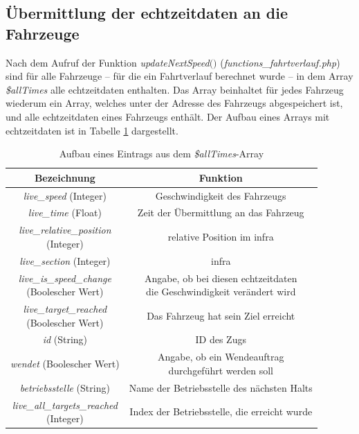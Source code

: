 \subsection{Übermittlung der \Gls{echtzeitdaten} an die Fahrzeuge} \label{main_4}
Nach dem Aufruf der Funktion \textit{updateNextSpeed$($$)$} (\textit{functions\_fahrtverlauf.php}) sind für alle Fahrzeuge -- für die ein Fahrtverlauf berechnet wurde -- in dem Array \textit{\$allTimes} alle \Gls{echtzeitdaten} enthalten. Das Array beinhaltet für jedes Fahrzeug wiederum ein Array, welches unter der Adresse des Fahrzeugs abgespeichert ist, und alle \Gls{echtzeitdaten} eines Fahrzeugs enthält. Der Aufbau eines Arrays mit \Gls{echtzeitdaten} ist in Tabelle \ref{table:aufbauAllTimes} dargestellt.
\begin{table}
\begin{center}
\renewcommand{\arraystretch}{1.4}
\begin{tabular}{c|c}
Bezeichnung & Funktion \\ \hline
\textit{live\_speed} (Integer)                  		&    Geschwindigkeit des Fahrzeugs                \\ \hline
\textit{live\_time} (Float)                  		&    Zeit der Übermittlung an das Fahrzeug                 \\ \hline
\makecell{\textit{live\_relative\_position}\\(Integer)}                  		&    relative Position im \ac{infra}                \\ \hline
\textit{live\_section} (Integer)                  		&    \ac{infra}                \\ \hline
\makecell{\textit{live\_is\_speed\_change}\\(Boolescher Wert)}                  		&    \makecell{Angabe, ob bei diesen \Gls{echtzeitdaten}\\die Geschwindigkeit verändert wird}                \\ \hline
\makecell{\textit{live\_target\_reached}\\(Boolescher Wert)}                  		&    Das Fahrzeug hat sein Ziel erreicht                \\ \hline
\textit{id} (String)                  		&    ID des Zugs                \\ \hline
\textit{wendet} (Boolescher Wert)                  		&    \makecell{Angabe, ob ein Wendeauftrag\\durchgeführt werden soll}                \\ \hline
\textit{betriebsstelle} (String)                  		&    Name der Betriebsstelle des nächsten Halts                \\ \hline
\makecell{\textit{live\_all\_targets\_reached}\\(Integer)}                  		&    Index der Betriebsstelle, die erreicht wurde                \\ 
\end{tabular}
\renewcommand{\arraystretch}{1}
\caption{Aufbau eines Eintrags aus dem \textit{\$allTimes}-Array}
\label{table:aufbauAllTimes}
\end{center}
\end{table}
